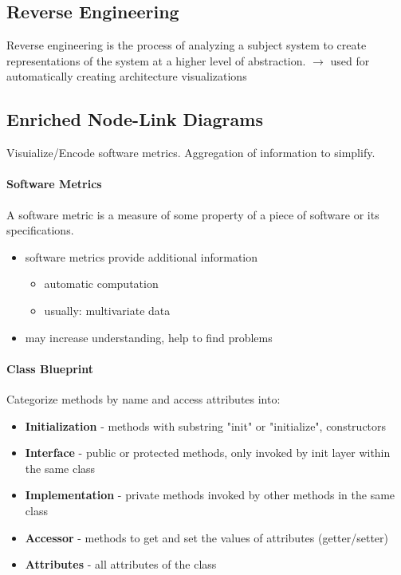 \documentclass[10pt,a4paper]{article}
\begin{document}
	\subsection{Reverse Engineering}
	Reverse engineering is the process of analyzing a subject system to create representations of the system at a higher level of abstraction. $\rightarrow$ used for automatically creating architecture visualizations
	
	\subsection{Enriched Node-Link Diagrams} 
	Visuialize/Encode software metrics. Aggregation of information to simplify.
	
	\paragraph{Software Metrics} A software metric is a measure of some property of a
	piece of software or its specifications.
	\begin{itemize}
		\item software metrics provide additional information
		\begin{itemize}
			\item automatic computation
			\item usually: multivariate data
		\end{itemize}
		\item may increase understanding, help to find problems
	\end{itemize}
	
	\paragraph{Class Blueprint}
	Categorize methods by name and access attributes into:
	\begin{itemize}
		\item \textbf{Initialization} - methods with substring "init" or "initialize", constructors
		\item \textbf{Interface} - public or protected methods, only invoked by init layer within the same class 
		\item \textbf{Implementation} - private methods invoked by other methods in the same class
		\item \textbf{Accessor} - methods to get and set the values of attributes (getter/setter)
		\item \textbf{Attributes} - all attributes of the class
	\end{itemize}
	
\end{document}
